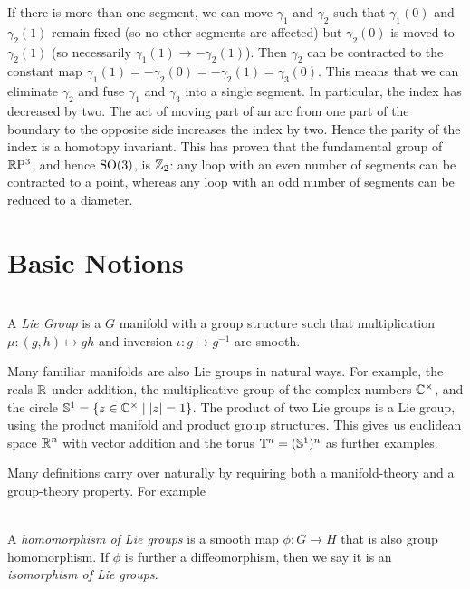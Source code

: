 If there is more than one segment, we can move $\gamma_1$ and $\gamma_2$ such that $\gamma_1(0)$ and $\gamma_2(1)$ remain fixed (so no other segments are affected) but $\gamma_2(0)$ is moved to $\gamma_2(1)$ (so necessarily $\gamma_1(1) \to - \gamma_2(1)$).
Then $\gamma_2$ can be contracted to the constant map $\gamma_1(1) = -\gamma_2(0) = -\gamma_2(1) = \gamma_3(0)$.
This means that we can eliminate $\gamma_2$ and fuse $\gamma_1$ and $\gamma_3$ into a single segment.
In particular, the index has decreased by two.
The act of moving part of an arc from one part of the boundary to the opposite side increases the index by two.
Hence the parity of the index is a homotopy invariant.
This has proven that the fundamental group of $\mathbb{R}\mathrm{P}^3$, and hence $\mathrm{SO}(3)$, is $\mathbb{Z}_2$:
any loop with an even number of segments can be contracted to a point, whereas any loop with an odd number of segments can be reduced to a diameter.


\section{Basic Notions}

\begin{definition}
\label{def:lie group}
\textup{\cite[3.1]{Warner1983}\cite[Definition~1.20]{Hall2015}} \\
A \emph{Lie Group} is a $G$ manifold with a group structure such that multiplication $\mu : (g,h) \mapsto gh$ and inversion $\iota : g \mapsto g^{-1}$ are smooth.
\end{definition}

Many familiar manifolds are also Lie groups in natural ways.
For example, the reals $\mathbb{R}$ under addition, the multiplicative group of the complex numbers $\mathbb{C}^\times$, and the circle $\mathbb{S}^1 = \{ z \in \mathbb{C}^\times \mid |z| = 1 \}$.
The product of two Lie groups is a Lie group, using the product manifold and product group structures.
This gives us euclidean space $\mathbb{R}^n$ with vector addition and the torus $\mathbb{T}^n = (\mathbb{S}^1)^n$ as further examples.

Many definitions carry over naturally by requiring both a manifold-theory and a group-theory property.
For example
\begin{definition}
\textup{\cite[3.13]{Warner1983}} \\
A \emph{homomorphism of Lie groups} is a smooth map $\phi : G \to H$ that is also group homomorphism.
If $\phi$ is further a diffeomorphism, then we say it is an \emph{isomorphism of Lie groups}.
\end{definition}


